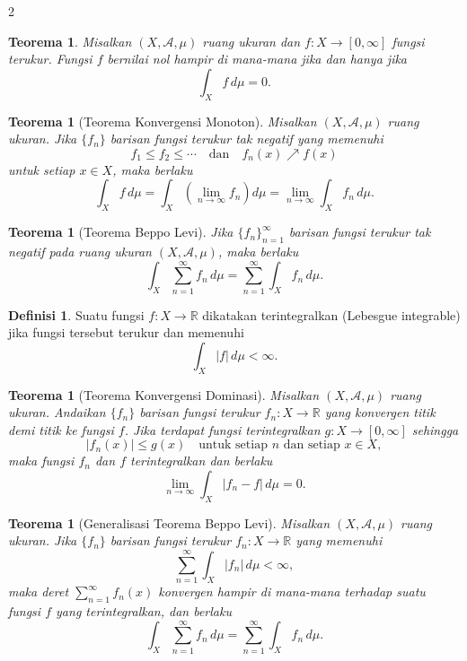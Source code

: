 \documentclass[a4paper,extrafontsizes, 9pt]{memoir}
\theoremstyle{definition}
\newtheorem{definisi}[kalstok]{Definisi}
\theoremstyle{plain}
\newtheorem{teorema}[kalstok]{Teorema}
\theoremstyle{remark}
\begin{document}
\begin{multicols}{2}
  \begin{teorema}
    Misalkan $(X,\mathcal{A},\mu)$ ruang ukuran dan $f:X\to[0,\infty]$ fungsi terukur.
    Fungsi $f$ bernilai nol hampir di mana-mana jika dan hanya jika
    \[\int_X f\,d\mu=0.\]
  \end{teorema}

  \begin{teorema}[Teorema Konvergensi Monoton]
    Misalkan $(X,\mathcal{A},\mu)$ ruang ukuran. Jika $\{f_n\}$ barisan fungsi terukur tak negatif yang memenuhi
    \[f_1\le f_2\le\cdots\quad\text{dan}\quad f_n(x)\nearrow f(x)\]
    untuk setiap $x\in X$, maka berlaku
    \[\int_X f\,d\mu=\int_X\left(\lim_{n\to\infty}f_n\right)d\mu=\lim_{n\to\infty}\int_X f_n\,d\mu.\]
  \end{teorema}

  \begin{teorema}[Teorema Beppo Levi]
    Jika $\{f_n\}_{n=1}^{\infty}$ barisan fungsi terukur tak negatif pada ruang ukuran $(X,\mathcal{A},\mu)$,
    maka berlaku
    \[\int_X\sum_{n=1}^{\infty}f_n\,d\mu=\sum_{n=1}^{\infty}\int_X f_n\,d\mu.\]
  \end{teorema}

  \begin{definisi}
    Suatu fungsi $f:X\to\mathbb{R}$ dikatakan terintegralkan (Lebesgue integrable) jika fungsi tersebut
    terukur dan memenuhi
    \[\int_X |f|\,d\mu<\infty.\]
  \end{definisi}

  \begin{teorema}[Teorema Konvergensi Dominasi]
    Misalkan $(X,\mathcal{A},\mu)$ ruang ukuran. Andaikan $\{f_n\}$ barisan fungsi terukur
    $f_n:X\to\mathbb{R}$ yang konvergen titik demi titik ke fungsi $f$.
    Jika terdapat fungsi terintegralkan $g:X\to[0,\infty]$ sehingga
    \[|f_n(x)|\le g(x)\quad\text{untuk setiap }n\text{ dan setiap }x\in X,\]
    maka fungsi $f_n$ dan $f$ terintegralkan dan berlaku
    \[\lim_{n\to\infty}\int_X |f_n-f|\,d\mu=0.\]
  \end{teorema}

  \begin{teorema}[Generalisasi Teorema Beppo Levi]
    Misalkan $(X,\mathcal{A},\mu)$ ruang ukuran. Jika $\{f_n\}$ barisan fungsi terukur
    $f_n:X\to\mathbb{R}$ yang memenuhi
    \[\sum_{n=1}^{\infty}\int_X |f_n|\,d\mu<\infty,\]
    maka deret $\sum_{n=1}^{\infty}f_n(x)$ konvergen hampir di mana-mana terhadap suatu fungsi
    $f$ yang terintegralkan, dan berlaku
    \[\int_X\sum_{n=1}^{\infty}f_n\,d\mu=\sum_{n=1}^{\infty}\int_X f_n\,d\mu.\]
  \end{teorema}


\end{multicols}
\end{document}
